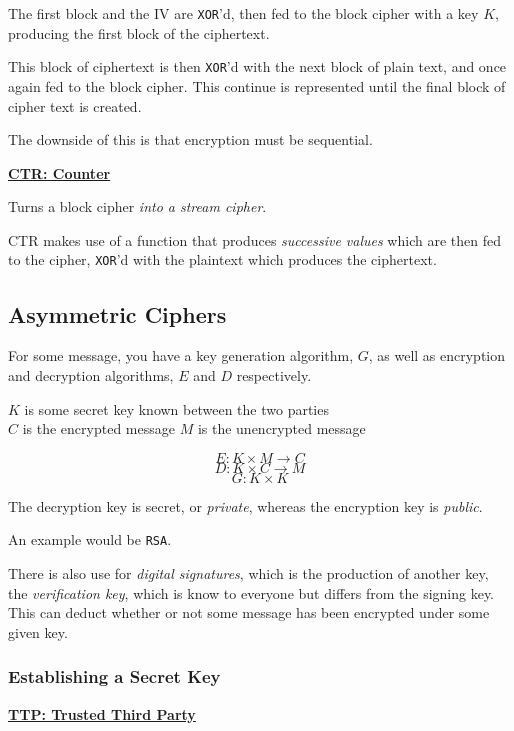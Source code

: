 \documentclass{article}
\begin{document}
The first block and the IV are \texttt{XOR}'d, then fed to the block cipher with a key $K$, producing the first block of the ciphertext.

This block of ciphertext is then \texttt{XOR}'d with the next block of plain text, and once again fed to the block cipher. This continue is represented until the final block of cipher text is created.

The downside of this is that encryption must be sequential.

\textbf{\underline{CTR: Counter}}

Turns a block cipher \textit{into a stream cipher}.

CTR makes use of a function that produces \textit{successive values} which are then fed to the cipher, \texttt{XOR}'d with the plaintext which produces the ciphertext.

\subsection{Asymmetric Ciphers}

For some message, you have a key generation algorithm, $G$, as well as
encryption and decryption algorithms, $E$ and $D$ respectively.

\vspace{.5cm}
\begin{center}
  $K$ is some secret key known between the two parties\\
  $C$ is the encrypted message $M$ is the unencrypted message
\end{center}

\[ E : K \times M \rightarrow C\]
\[ D : K \times C \rightarrow M\]
\[ G : K \times K \]

The decryption key is secret, or \textit{private}, whereas the
encryption key is \textit{public}.

An example would be \texttt{RSA}.
 
There is also use for \textit{digital signatures}, which is the
production of another key, the \textit{verification key}, which is
know to everyone but differs from the signing key. This can deduct
whether or not some message has been encrypted under some given key.

\filbreak
\subsubsection{Establishing a Secret Key}

\textbf{\underline{TTP: Trusted Third Party}}
\end{document}
